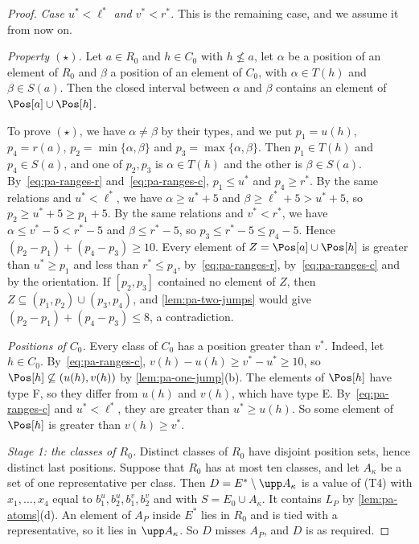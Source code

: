 \begin{proof}
\emph{Case $u^* < \ell^*$ and $v^* < r^*$.}
This is the remaining case, and we assume it from now on.

\emph{Property $(\star)$.}
Let $a \in R_0$ and $h \in C_0$ with $h \not\leq a$, let $\alpha$ be a position of an element of $R_0$ and $\beta$ a position of an element of $C_0$, with $\alpha \in T(h)$ and $\beta \in S(a)$.
Then the closed interval between $\alpha$ and $\beta$ contains an element of $\Pos[a] \cup \Pos[h]$.

To prove $(\star)$, we have $\alpha \neq \beta$ by their types, and we put $p_1 = u(h)$, $p_4 = r(a)$, $p_2 = \min\{\alpha, \beta\}$ and $p_3 = \max\{\alpha, \beta\}$.
Then $p_1 \in T(h)$ and $p_4 \in S(a)$, and one of $p_2, p_3$ is $\alpha \in T(h)$ and the other is $\beta \in S(a)$.
By~\eqref{eq:pa-ranges-r} and~\eqref{eq:pa-ranges-c}, $p_1 \leq u^*$ and $p_4 \geq r^*$.
By the same relations and $u^* < \ell^*$, we have $\alpha \geq u^* + 5$ and $\beta \geq \ell^* + 5 > u^* + 5$, so $p_2 \geq u^* + 5 \geq p_1 + 5$.
By the same relations and $v^* < r^*$, we have $\alpha \leq v^* - 5 < r^* - 5$ and $\beta \leq r^* - 5$, so $p_3 \leq r^* - 5 \leq p_4 - 5$.
Hence $(p_2 - p_1) + (p_4 - p_3) \geq 10$.
Every element of $Z = \Pos[a] \cup \Pos[h]$ is greater than $u^* \geq p_1$ and less than $r^* \leq p_4$, by~\eqref{eq:pa-ranges-r}, by~\eqref{eq:pa-ranges-c} and by the orientation.
If $[p_2, p_3]$ contained no element of $Z$, then $Z \subseteq (p_1, p_2) \cup (p_3, p_4)$, and \cref{lem:pa-two-jumps} would give $(p_2 - p_1) + (p_4 - p_3) \leq 8$, a contradiction.

\emph{Positions of $C_0$.}
Every class of $C_0$ has a position greater than $v^*$.
Indeed, let $h \in C_0$.
By~\eqref{eq:pa-ranges-c}, $v(h) - u(h) \geq v^* - u^* \geq 10$, so $\Pos[h] \not\subseteq (u(h), v(h))$ by \cref{lem:pa-one-jump}(b).
The elements of $\Pos[h]$ have type F, so they differ from $u(h)$ and $v(h)$, which have type E.
By~\eqref{eq:pa-ranges-c} and $u^* < \ell^*$, they are greater than $u^* \geq u(h)$.
So some element of $\Pos[h]$ is greater than $v(h) \geq v^*$.

\emph{Stage 1: the classes of $R_0$.}
Distinct classes of $R_0$ have disjoint position sets, hence distinct last positions.
Suppose that $R_0$ has at most ten classes, and let $A_\kappa$ be a set of one representative per class.
Then $D = E^* \setminus \upp A_\kappa$ is a value of (T4) with $x_1, \dots, x_4$ equal to $b^u_1, b^u_2, b^v_1, b^v_2$ and with $S = E_0 \cup A_\kappa$.
It contains $L_P$ by \cref{lem:pa-atoms}(d).
An element of $A_P$ inside $E^*$ lies in $R_0$ and is tied with a representative, so it lies in $\upp A_\kappa$.
So $D$ misses $A_P$, and $D$ is as required.


\end{proof}
